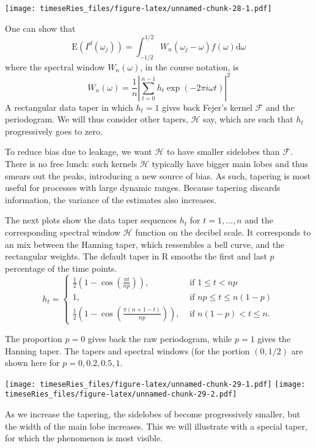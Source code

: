 \documentclass[]{book}
\begin{document}
\texttt{[image: timeseRies\_files/figure-latex/unnamed-chunk-28-1.pdf]}

One can show that
\[\mathrm{E}\left(I^d(\omega_j)\right) = \int_{-1/2}^{1/2}W_n(\omega_j-\omega)f(\omega)\mathrm{d} \omega\]
where the spectral window \(W_n(\omega)\), in the course notation, is
\[W_n(\omega) = \frac{1}{n}\left| \sum_{t=0}^{n-1} h_t \exp(-2\pi i \omega t) \right|^2\]
A rectangular data taper in which \(h_t = 1\) gives back Fejer's kernel
\(\mathcal{F}\) and the periodogram. We will thus consider other tapers,
\(\mathcal{H}\) say, which are such that \(h_t\) progressively goes to
zero.

To reduce bias due to leakage, we want \(\mathcal{H}\) to have smaller
sidelobes than \(\mathcal{F}\). There is no free lunch: such kernels
\(\mathcal{H}\) typically have bigger main lobes and thus smears out the
peaks, introducing a new source of bias. As such, tapering is most
useful for processes with large dynamic ranges. Because tapering
discards information, the variance of the estimates also increases.

The next plots show the data taper sequences \(h_t\) for
\(t=1, \ldots, n\) and the corresponding spectral window \(\mathcal{H}\)
function on the decibel scale. It corresponds to an mix between the
Hanning taper, which ressembles a bell curve, and the rectangular
weights. The default taper in R smooths the first and last \(p\)
percentage of the time points. \[
h_t = 
\begin{cases}
\frac{1}{2}\left(1-\cos\left(\frac{\pi t}{np}\right)\right), & \text{ if } 1\le t< np
\\
1,  &\text{ if } np \le t \le n(1-p)
\\
\frac{1}{2}\left(1-\cos\left(\frac{\pi (n+1-t)}{np}\right)\right), &\text{ if }  n(1-p)<t\le n.
\end{cases}
\]

The proportion \(p=0\) gives back the raw periodogram, while \(p=1\)
gives the Hanning taper. The tapers and spectral windows (for the
portion \((0,1/2)\) are shown here for \(p=0, 0.2, 0.5, 1\).

\texttt{[image: timeseRies\_files/figure-latex/unnamed-chunk-29-1.pdf]}
\texttt{[image: timeseRies\_files/figure-latex/unnamed-chunk-29-2.pdf]}

As we increase the tapering, the sidelobes of become progressively
smaller, but the width of the main lobe increases. This we will
illustrate with a special taper, for which the phenomenon is most
visible.
\end{document}
